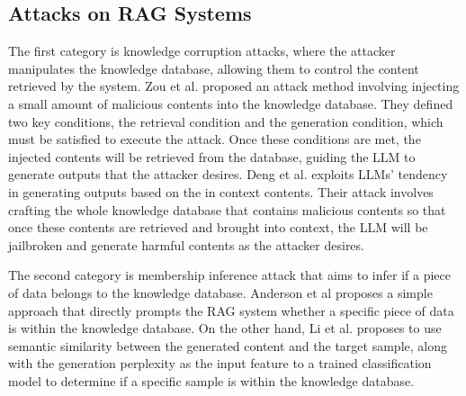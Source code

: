 \subsection{Attacks on RAG Systems}
The first category is knowledge corruption attacks, where the attacker manipulates the knowledge database, allowing them to control the content retrieved by the system. Zou et al.\cite{zou_poisonedrag_2024} proposed an attack method involving injecting a small amount of malicious contents into the knowledge database. They defined two key conditions, the retrieval condition and the generation condition, which must be satisfied to execute the attack. Once these conditions are met, the injected contents will be retrieved from the database, guiding the LLM to generate outputs that the attacker desires. Deng et al. \cite{deng_pandora_2024} exploits LLMs' tendency in generating outputs based on the in context contents. Their attack involves crafting the whole knowledge database that contains malicious contents so that once these contents are retrieved and brought into context, the LLM will be jailbroken and generate harmful contents as the attacker desires. 

The second category is membership inference attack that aims to infer if a piece of data belongs to the knowledge database. Anderson et al \cite{anderson_is_nodate} proposes a simple approach that directly prompts the RAG system whether a specific piece of data is within the knowledge database. On the other hand, Li et al. \cite{liGeneratingBelievingMembership2024} proposes to use semantic similarity between the generated content and the target sample, along with the generation perplexity as the input feature to a trained classification model to determine if a specific sample is within the knowledge database.

